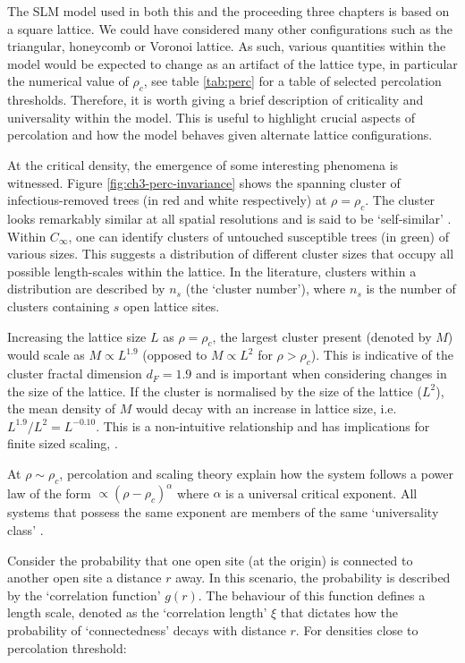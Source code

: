 The SLM model used in both this and the proceeding three chapters is based on a square lattice. %
We could have considered many other configurations such as the triangular, honeycomb or Voronoi lattice. %
As such, various quantities within the model would be expected to change as an artifact of the lattice type, %
in particular the numerical value of $\rho_c$, see table \ref{tab:perc} for a table of selected percolation thresholds. %
Therefore, it is worth giving a brief description of criticality and universality within the model. %
This is useful to highlight crucial aspects of percolation and how the model  behaves given alternate lattice configurations. %

At the critical density, the emergence of some interesting phenomena is witnessed. %
Figure \ref{fig:ch3-perc-invariance} shows the spanning cluster of infectious-removed trees (in red and white respectively) at $\rho =\rho_c$. %
The cluster looks remarkably similar at all spatial resolutions and is said to be `self-similar' \citep{Kapitulnik_1983}. %
Within $C_\infty$, one can identify clusters of untouched susceptible trees (in green) of various sizes. %
This suggests a distribution of different cluster sizes that occupy all possible length-scales within the lattice. %
In the literature, clusters within a distribution are described by $n_s$ (the `cluster number'), where $n_s$ is the number of clusters containing $s$ open lattice sites. %

Increasing the lattice size $L$ as $\rho = \rho_c$, the largest cluster present (denoted by $M$) would scale as $M\propto L^{1.9}$ (opposed to $M\propto L^{2}$ for $\rho > \rho_c$). %
This is indicative of the cluster fractal dimension $d_F=1.9$ and is important when considering changes in the size of the lattice. %
If the cluster is normalised by the size of the lattice ($L^2$), the mean density of $M$ would decay with an increase in lattice size, i.e. $L^{1.9}/L^2 = L^{-0.10}$. %
This is a non-intuitive relationship and has implications for finite sized scaling, \cite[see][p8 for more information]{stauffer2018introduction}. %

At $\rho \sim \rho_c$, percolation and scaling theory explain how the system follows a power law of the form $\propto (\rho - \rho_c)^{\alpha}$ where $\alpha$ is a universal critical exponent. %
All systems that possess the same exponent are members of the same `universality class' \citep{PhysRev.180.594, RevModPhys.76.663}. %

Consider the probability that one open site (at the origin) is connected to another open site a distance $r$ away. %
In this scenario, the probability is described by the `correlation function' $g(r)$. %
The behaviour of this function defines a length scale, denoted as the `correlation length' $\xi$ that dictates how the probability of `connectedness' decays with distance $r$. %
For densities close to percolation threshold: %


